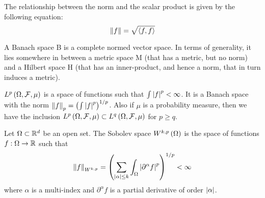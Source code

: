 The relationship between the norm and the scalar product is given by the following equation:
\begin{equation*}
    \left\| f \right\|=\sqrt{\left\langle f,f\right\rangle}
\end{equation*}
\begin{remark}
    A Banach space B is a complete normed vector space. In terms of generality, it lies somewhere in between a metric space M (that has a metric, but no norm) and a Hilbert space H (that has an inner-product, and hence a norm, that in turn induces a metric). 
\end{remark}
\begin{example}
    $L^p\left(\Omega, \mathcal{F}, \mu\right)$ is a space of functions such that $\int\left| f\right|^p<\infty$. It is a Banach space with the norm $\left\| f \right\|_p=\left(\int\left| f\right|^p\right)^{1/p}$. Also if $\mu$ is a probability measure, then we have the inclusion $L^p\left(\Omega, \mathcal{F}, \mu\right)\subset L^q\left(\Omega, \mathcal{F}, \mu\right)$ for $p\geq q$.
\end{example}
\begin{definition}
    Let $\Omega\subset\mathbb{R}^d$ be an open set. The Sobolev space $W^{k,p}\left(\Omega\right)$ is the space of functions $f:\Omega\rightarrow\mathbb{R}$ such that
    \begin{equation*}
        \left\| f \right\|_{W^{k,p}}=\left(\sum_{\left| \alpha\right|\leq k}\int_{\Omega}\left| \partial^{\alpha}f\right|^p\right)^{1/p}<\infty
    \end{equation*}
    where $\alpha$ is a multi-index and $\partial^{\alpha}f$ is a partial derivative of order $\left| \alpha\right|$.
    
\end{definition}

